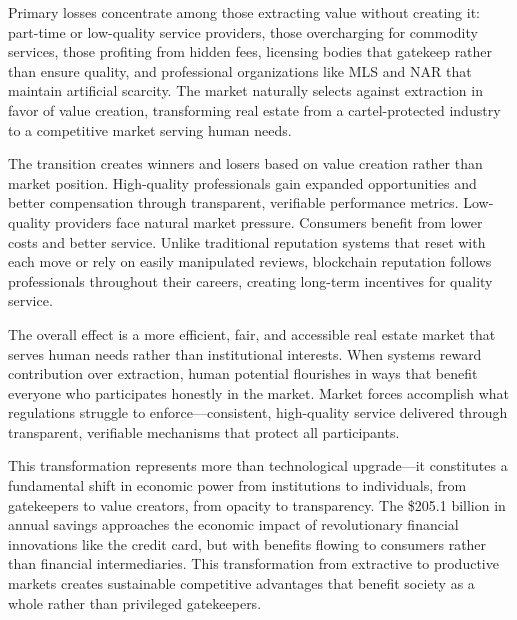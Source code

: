 Primary losses concentrate among those extracting value without creating it: part-time or low-quality service providers, those overcharging for commodity services, those profiting from hidden fees, licensing bodies that gatekeep rather than ensure quality, and professional organizations like MLS and NAR that maintain artificial scarcity. The market naturally selects against extraction in favor of value creation, transforming real estate from a cartel-protected industry to a competitive market serving human needs.

The transition creates winners and losers based on value creation rather than market position. High-quality professionals gain expanded opportunities and better compensation through transparent, verifiable performance metrics. Low-quality providers face natural market pressure. Consumers benefit from lower costs and better service. Unlike traditional reputation systems that reset with each move or rely on easily manipulated reviews, blockchain reputation follows professionals throughout their careers, creating long-term incentives for quality service.

The overall effect is a more efficient, fair, and accessible real estate market that serves human needs rather than institutional interests. When systems reward contribution over extraction, human potential flourishes in ways that benefit everyone who participates honestly in the market. Market forces accomplish what regulations struggle to enforce---consistent, high-quality service delivered through transparent, verifiable mechanisms that protect all participants.

This transformation represents more than technological upgrade---it constitutes a fundamental shift in economic power from institutions to individuals, from gatekeepers to value creators, from opacity to transparency. The \$205.1 billion in annual savings approaches the economic impact of revolutionary financial innovations like the credit card, but with benefits flowing to consumers rather than financial intermediaries. This transformation from extractive to productive markets creates sustainable competitive advantages that benefit society as a whole rather than privileged gatekeepers.
